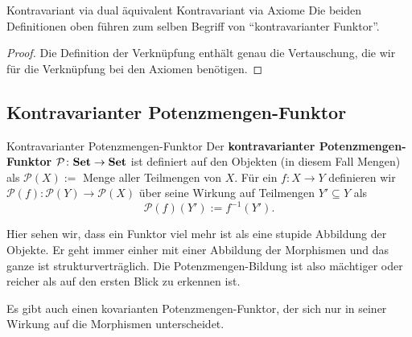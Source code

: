 \documentclass[a4paper]{amsart}
\theoremstyle{definition}
\newcommand{\PP}{\ensuremath{\mathcal{ P }}}
\newcommand{\Set}{\text{\textbf{Set}}}
\begin{document}
\begin{Satz}{Kontravariant via dual äquivalent Kontravariant via Axiome}
   Die beiden Definitionen oben führen zum selben Begriff von "`kontravarianter Funktor"'.
\end{Satz}
\begin{proof}
   Die Definition der Verknüpfung enthält genau die Vertauschung, die wir für die Verknüpfung bei den Axiomen benötigen.
\end{proof}

\subsection{Kontravarianter Potenzmengen-Funktor}
\begin{Definition}{Kontravarianter Potenzmengen-Funktor}
   Der \textbf{kontravarianter Potenzmengen-Funktor} $\PP \colon \Set \to \Set$ ist definiert auf den Objekten (in diesem Fall Mengen) als $\PP( X ) := $ Menge aller Teilmengen von $X$. Für ein $f \colon X \to Y$ definieren wir $\PP(f) \colon \PP(Y) \to \PP(X)$ über seine Wirkung auf Teilmengen $Y' \subseteq Y$ als
   \begin{equation}
      \PP(f)(Y') := f^{-1}(Y').
   \end{equation}
\end{Definition}   
Hier sehen wir, dass ein Funktor viel mehr ist als eine stupide Abbildung der Objekte. Er geht immer einher mit einer Abbildung der Morphismen und das ganze ist strukturverträglich. Die Potenzmengen-Bildung ist also mächtiger oder reicher als auf den ersten Blick zu erkennen ist.

Es gibt auch einen kovarianten Potenzmengen-Funktor, der sich nur in seiner Wirkung  auf die Morphismen unterscheidet.

\end{document}
